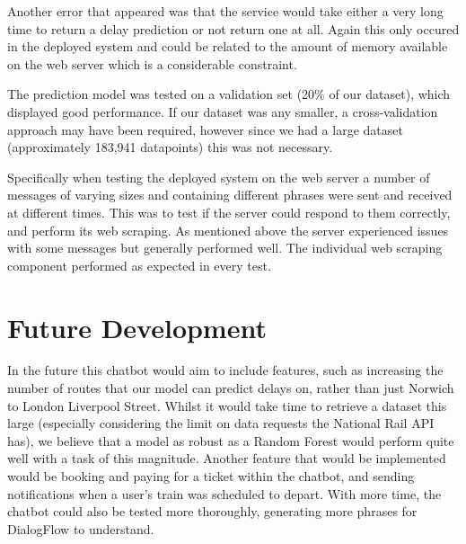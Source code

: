 \documentclass[12pt,a4paper]{article}
\begin{document}
    Another error that appeared was that the service would take either a very long time to return a delay prediction or not return one at all. Again this only occured in the deployed system and could be related to the amount of memory available on the web server which is a considerable constraint.
    
    The prediction model was tested on a validation set (20\% of our dataset), which displayed good performance. If our dataset was any smaller, a cross-validation approach may have been required, however since we had a large dataset (approximately 183,941 datapoints) this was not necessary.
    
    Specifically when testing the deployed system on the web server a number of messages of varying sizes and containing different phrases were sent and received at different times. This was to test if the server could respond to them correctly, and perform its web scraping. As mentioned above the server experienced issues with some messages but generally performed well. The individual web scraping component performed as expected in every test.

    \section{Future Development}
    In the future this chatbot would aim to include features, such as increasing the number of routes that our model can predict delays on, rather than just Norwich to London Liverpool Street. Whilst it would take time to retrieve a dataset this large (especially considering the limit on data requests the National Rail API has), we believe that a model as robust as a Random Forest would perform quite well with a task of this magnitude. Another feature that would be implemented would be booking and paying for a ticket within the chatbot, and sending notifications when a user's train was scheduled to depart. With more time, the chatbot could also be tested more thoroughly, generating more phrases for DialogFlow to understand.
    
    
    
    
\end{document}
